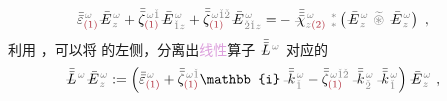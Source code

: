 \begin{align} \label{eq:nonlinear(2)-wave_wkrho-simplify5-vector}
	\bar{\bar{\varepsilon}}^{\;\! \mathcolor{gray}{\omega}}_{\textcolor{Maroon}{(1)}} \Xint{\mathcolor{gray}{-}}{295}{\bar{E}}^{\;\!\mathcolor{gray}{\omega}}_{\;\! \mathcolor{gray}{z}} + \bar{\bar{\zeta}}^{\;\! \mathcolor{gray}{\omega} \mathcolor{gray}{\check{1}}}_{\textcolor{Maroon}{(1)}} \Xint{\mathcolor{gray}{-}}{295}{\bar{E}}^{\;\!\mathcolor{gray}{\omega}}_{\;\! \mathcolor{gray}{\check{1}} \mathcolor{gray}{z}} + \bar{\bar{\zeta}}^{\;\! \mathcolor{gray}{\omega} \mathcolor{gray}{\check{1} \check{2}}}_{\textcolor{Maroon}{(1)}} \Xint{\mathcolor{gray}{-}}{295}{\bar{E}}^{\;\!\mathcolor{gray}{\omega}}_{\;\! \mathcolor{gray}{\check{2} \check{1}} \mathcolor{gray}{z}}
	= &- \Xint{{}^{}_{\mathcolor{gray}{-}}}{23}{\bar{\bar{\bar{\chi}}}}^{\;\! \mathcolor{gray}{\omega}}_{\mathcolor{gray}{z} \textcolor{Maroon}{(2)}} ~{}^{\mathcolor{gray}{*}}_{\mathcolor{gray}{*}} \left( \Xint{\mathcolor{gray}{-}}{295}{\bar{E}}^{\;\!\mathcolor{gray}{\omega}}_{\;\! \mathcolor{gray}{z}} ~\mathcolor{gray}{\widetilde \circledast}~ \Xint{\mathcolor{gray}{-}}{295}{\bar{E}}^{\;\!\mathcolor{gray}{\omega}}_{\;\! \mathcolor{gray}{z}} \right) ~,
\end{align}
利用 ，可以将  的左侧，分离出\textcolor{Plum}{线性}算子 $\Xint{\mathcolor{gray}{-}}{30}{\bar{\bar{L}}}^{\;\! \mathcolor{gray}{\omega}}$ 对应的
\begin{align} \label{eq:matrix_exp_eq-left_L}
	\Xint{\mathcolor{gray}{-}}{32}{\bar{\bar{L}}}^{\;\! \mathcolor{gray}{\omega}} \Xint{\mathcolor{gray}{-}}{295}{\bar{E}}^{\;\!\mathcolor{gray}{\omega}}_{\;\! \mathcolor{gray}{z}} &:= \left( \bar{\bar{\varepsilon}}^{\;\! \mathcolor{gray}{\omega}}_{\textcolor{Maroon}{(1)}} + \bar{\bar{\zeta}}^{\;\! \mathcolor{gray}{\omega} \mathcolor{gray}{\check{1}}}_{\textcolor{Maroon}{(1)}} \mathbb{i} \Xint{\begin{smallmatrix} ~ \\ {}^{}_{\mathcolor{gray}{-}} \\ ~ \end{smallmatrix}}{15}{\bar{\bar{k}}}_{\;\! \mathcolor{gray}{\check{1}}}^{\;\! \mathcolor{gray}{\omega}} - \bar{\bar{\zeta}}^{\;\! \mathcolor{gray}{\omega} \mathcolor{gray}{\check{1} \check{2}}}_{\textcolor{Maroon}{(1)}} \Xint{\begin{smallmatrix} ~ \\ {}^{}_{\mathcolor{gray}{-}} \\ ~ \end{smallmatrix}}{15}{\bar{\bar{k}}}_{\;\! \mathcolor{gray}{\check{2}}}^{\;\! \mathcolor{gray}{\omega}} \Xint{\begin{smallmatrix} ~ \\ {}^{}_{\mathcolor{gray}{-}} \\ ~ \end{smallmatrix}}{15}{\bar{\bar{k}}}_{\;\! \mathcolor{gray}{\check{1}}}^{\;\! \mathcolor{gray}{\omega}} \right) \Xint{\mathcolor{gray}{-}}{295}{\bar{E}}^{\;\!\mathcolor{gray}{\omega}}_{\;\! \mathcolor{gray}{z}} ~,
\end{align}

